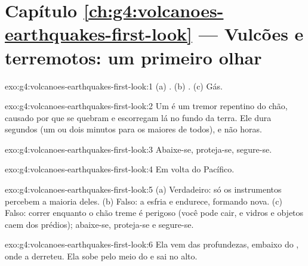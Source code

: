 \section*{Capítulo \ref{ch:g4:volcanoes-earthquakes-first-look} --- Vulcões e terremotos: um primeiro olhar}

\begin{solution}{exo:g4:volcanoes-earthquakes-first-look:1}
(a) . (b) . (c) Gás.
\end{solution}

\begin{solution}{exo:g4:volcanoes-earthquakes-first-look:2}
Um  é um tremor repentino do chão, causado por  que se
quebram e escorregam lá no fundo da terra. Ele dura segundos (um ou dois
minutos para os maiores de todos), e não horas.
\end{solution}

\begin{solution}{exo:g4:volcanoes-earthquakes-first-look:3}
Abaixe-se, proteja-se, segure-se.
\end{solution}

\begin{solution}{exo:g4:volcanoes-earthquakes-first-look:4}
Em volta do  Pacífico.
\end{solution}

\begin{solution}{exo:g4:volcanoes-earthquakes-first-look:5}
(a) Verdadeiro: só os instrumentos percebem a maioria deles. (b) Falso: a
 esfria e endurece, formando  nova. (c) Falso: correr enquanto o
chão treme é perigoso (você pode cair, e vidros e objetos caem dos
prédios); abaixe-se, proteja-se e segure-se.
\end{solution}

\begin{solution}{exo:g4:volcanoes-earthquakes-first-look:6}
Ela vem das profundezas, embaixo do , onde a  derreteu. Ela
sobe pelo meio do  e sai no alto.
\end{solution}

